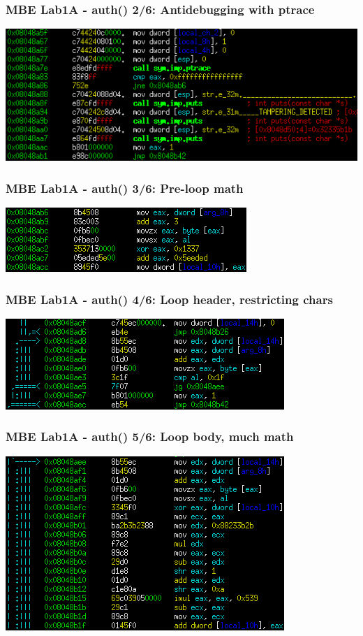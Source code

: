 \documentclass[aspectratio=169]{beamer}
\begin{document}
\begin{frame}[fragile]
\frametitle{MBE Lab1A - auth() 2/6: Antidebugging with ptrace}
\includegraphics[width=0.9\paperwidth]{pictures/intel/mbe_lab1a_auth_chunk2.png}
\end{frame}

\begin{frame}[fragile]
\frametitle{MBE Lab1A - auth() 3/6: Pre-loop math}
\includegraphics[width=0.9\paperwidth]{pictures/intel/mbe_lab1a_auth_chunk3.png}
\end{frame}

\begin{frame}[fragile]
\frametitle{MBE Lab1A - auth() 4/6: Loop header, restricting chars}
\includegraphics[width=0.9\paperwidth]{pictures/intel/mbe_lab1a_auth_chunk4.png}
\end{frame}

\begin{frame}[fragile]
\frametitle{MBE Lab1A - auth() 5/6: Loop body, much math}
\includegraphics[width=0.8\paperwidth]{pictures/intel/mbe_lab1a_auth_chunk5.png}
\end{frame}
\end{document}
